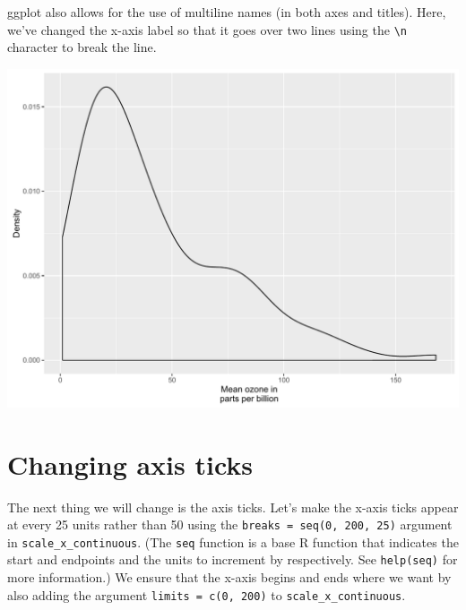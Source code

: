 ggplot also allows for the use of multiline names (in both axes and
titles). Here, we've changed the x-axis label so that it goes over two
lines using the \texttt{\textbackslash{}n} character to break the line.

\begin{Shaded}
\begin{Highlighting}[]
\StringTok{ }\StringTok{ }\NormalTok{(} \NormalTok{)}
\end{Highlighting}
\end{Shaded}

\begin{center}\includegraphics[width=0.55\linewidth]{figures/density_3-1} \end{center}

\section{Changing axis ticks}\label{changing-axis-ticks-1}

The next thing we will change is the axis ticks. Let's make the x-axis
ticks appear at every 25 units rather than 50 using the
\texttt{breaks\ =\ seq(0,\ 200,\ 25)} argument in
\texttt{scale\_x\_continuous}. (The \texttt{seq} function is a base R
function that indicates the start and endpoints and the units to
increment by respectively. See \texttt{help(seq)} for more information.)
We ensure that the x-axis begins and ends where we want by also adding
the argument \texttt{limits\ =\ c(0,\ 200)} to
\texttt{scale\_x\_continuous}.

\begin{Shaded}
\begin{Highlighting}[]
\StringTok{ }\StringTok{ }\NormalTok{(} \NormalTok{,}
\StringTok{        } \NormalTok{(}\NormalTok{, }\NormalTok{, }\NormalTok{),}
\StringTok{        }\NormalTok{(}\NormalTok{, }\NormalTok{))}
\end{Highlighting}
\end{Shaded}

